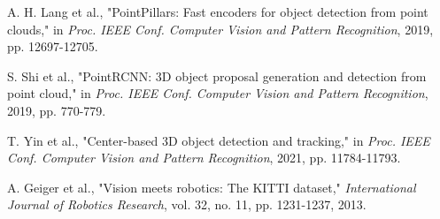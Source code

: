 \documentclass[conference]{IEEEtran}
\begin{document}
\begin{thebibliography}{99}
 A. H. Lang et al., "PointPillars: Fast encoders for object detection from point clouds," in \textit{Proc. IEEE Conf. Computer Vision and Pattern Recognition}, 2019, pp. 12697-12705.

 S. Shi et al., "PointRCNN: 3D object proposal generation and detection from point cloud," in \textit{Proc. IEEE Conf. Computer Vision and Pattern Recognition}, 2019, pp. 770-779.

 T. Yin et al., "Center-based 3D object detection and tracking," in \textit{Proc. IEEE Conf. Computer Vision and Pattern Recognition}, 2021, pp. 11784-11793.

 A. Geiger et al., "Vision meets robotics: The KITTI dataset," \textit{International Journal of Robotics Research}, vol. 32, no. 11, pp. 1231-1237, 2013.

\end{thebibliography}
\end{document}
